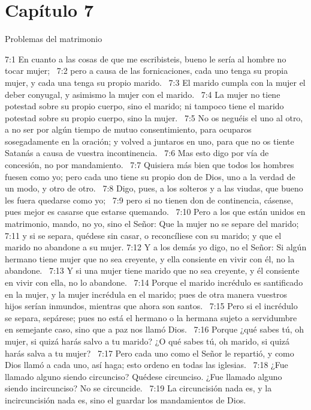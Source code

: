 \section*{Capítulo 7}
Problemas del matrimonio  

7:1 En cuanto a las cosas de que me escribisteis, bueno le sería al hombre no tocar mujer;  
7:2 pero a causa de las fornicaciones, cada uno tenga su propia mujer, y cada una tenga su propio marido.  
7:3 El marido cumpla con la mujer el deber conyugal, y asimismo la mujer con el marido.  
7:4 La mujer no tiene potestad sobre su propio cuerpo, sino el marido; ni tampoco tiene el marido potestad sobre su propio cuerpo, sino la mujer.  
7:5 No os neguéis el uno al otro, a no ser por algún tiempo de mutuo consentimiento, para ocuparos sosegadamente en la oración; y volved a juntaros en uno, para que no os tiente Satanás a causa de vuestra incontinencia.  
7:6 Mas esto digo por vía de concesión, no por mandamiento.  
7:7 Quisiera más bien que todos los hombres fuesen como yo; pero cada uno tiene su propio don de Dios, uno a la verdad de un modo, y otro de otro.  
7:8 Digo, pues, a los solteros y a las viudas, que bueno les fuera quedarse como yo;  
7:9 pero si no tienen don de continencia, cásense, pues mejor es casarse que estarse quemando.  
7:10 Pero a los que están unidos en matrimonio, mando, no yo, sino el Señor: Que la mujer no se separe del marido;  
7:11 y si se separa, quédese sin casar, o reconcíliese con su marido; y que el marido no abandone a su mujer. 
7:12 Y a los demás yo digo, no el Señor: Si algún hermano tiene mujer que no sea creyente, y ella consiente en vivir con él, no la abandone.  
7:13 Y si una mujer tiene marido que no sea creyente, y él consiente en vivir con ella, no lo abandone.  
7:14 Porque el marido incrédulo es santificado en la mujer, y la mujer incrédula en el marido; pues de otra manera vuestros hijos serían inmundos, mientras que ahora son santos.  
7:15 Pero si el incrédulo se separa, sepárese; pues no está el hermano o la hermana sujeto a servidumbre en semejante caso, sino que a paz nos llamó Dios.  
7:16 Porque ¿qué sabes tú, oh mujer, si quizá harás salvo a tu marido? ¿O qué sabes tú, oh marido, si quizá harás salva a tu mujer?  
7:17 Pero cada uno como el Señor le repartió, y como Dios llamó a cada uno, así haga; esto ordeno en todas las iglesias.  
7:18 ¿Fue llamado alguno siendo circunciso? Quédese circunciso. ¿Fue llamado alguno siendo incircunciso? No se circuncide.  
7:19 La circuncisión nada es, y la incircuncisión nada es, sino el guardar los mandamientos de Dios.  
